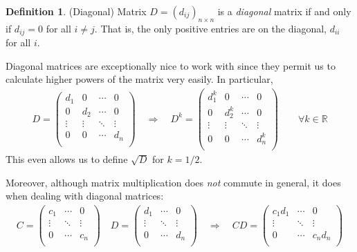 \documentclass[12pt]{book}
\numberwithin{equation}{section} %
\theoremstyle{plain}
\theoremstyle{definition}
\newtheorem{defn}[thm]{Definition}
\theoremstyle{remark}
\newcommand{\R}{\mathbb{R}}
\begin{document}
\begin{defn}{(Diagonal)}
Matrix $D=(d_{ij})_{n\times n}$ is a \emph{diagonal} matrix if and only
if $d_{ij}=0$ for all $i\neq j$. That is, the only positive entries are
on the diagonal, $d_{ii}$ for all $i$.

Diagonal matrices are exceptionally nice to work with since they permit
us to calculate higher powers of the matrix very easily. In particular,
\begin{align*}
  D =
  \begin{pmatrix}
    d_1 & 0 & \cdots & 0 \\
      0 & d_2 & \cdots & 0 \\
    \vdots & \vdots & \ddots & \vdots \\
    0 & 0 & \cdots & d_n \\
  \end{pmatrix}
  \quad\Rightarrow\quad
  D^k =
  \begin{pmatrix}
    d_1^k & 0 & \cdots & 0 \\
      0 & d_2^k & \cdots & 0 \\
    \vdots & \vdots & \ddots & \vdots \\
    0 & 0 & \cdots & d_n^k \\
  \end{pmatrix}
  \qquad
  \forall k \in \R
\end{align*}
This even allows us to define $\sqrt{D}$ for $k=1/2$.

Moreover, although matrix multiplication does \emph{not} commute in
general, it does when dealing with diagonal matrices:
\begin{align*}
  C =
  \begin{pmatrix}
    c_1 & \cdots & 0 \\
    \vdots & \ddots & \vdots \\
    0 & \cdots & c_n \\
  \end{pmatrix}
  \quad
  D =
  \begin{pmatrix}
    d_1 & \cdots & 0 \\
    \vdots & \ddots & \vdots \\
    0 & \cdots & d_n \\
  \end{pmatrix}
  \quad\Rightarrow\quad
  CD =
  \begin{pmatrix}
    c_1d_1 & \cdots & 0 \\
    \vdots & \ddots & \vdots \\
    0 & \cdots & c_n d_n \\
  \end{pmatrix}
\end{align*}
\end{defn}
\end{document}
